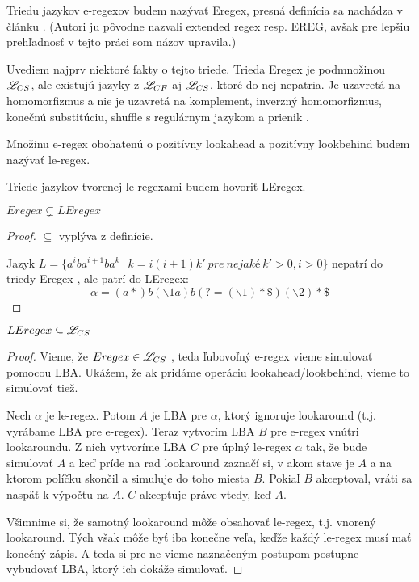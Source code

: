 Triedu jazykov e-regexov budem nazývať Eregex, presná definícia sa nachádza v článku \cite{ExtendedRegexPower}. (Autori ju pôvodne nazvali extended regex resp. EREG, avšak pre lepšiu prehľadnosť v tejto práci som názov upravila.)

Uvediem najprv niektoré fakty o tejto triede.
Trieda Eregex je podmnožinou $\mathscr{L}_{CS}$, ale existujú jazyky z $\mathscr{L}_{CF}$ aj $\mathscr{L}_{CS}$, ktoré do nej nepatria. Je uzavretá na homomorfizmus a nie je uzavretá na komplement, inverzný homomorfizmus, konečnú substitúciu, shuffle s regulárnym jazykom \cite{ExtendedRegexPower} a prienik \cite{ExtendedRegexIntersec}.

\begin{df}
Množinu e-regex obohatenú o pozitívny lookahead a pozitívny lookbehind budem nazývať le-regex.
\end{df}

\begin{df}
Triede jazykov tvorenej le-regexami budem hovoriť LEregex.
\end{df}

\begin{veta}
$ Eregex \subsetneq LEregex $
\end{veta}
\begin{proof}
$ \subseteq $ vyplýva z definície.

Jazyk $L = \lbrace a^iba^{i+1}ba^k ~|~ k=i(i+1)k' ~ pre ~ nejaké ~ k'>0, i>0 \rbrace$ nepatrí do triedy Eregex \cite[Lemma 2]{ExtendedRegexIntersec}, ale patrí do LEregex:
$$ \alpha = (a*)b(\backslash 1a)b(?=(\backslash 1)* \mathdollar )(\backslash 2)* \mathdollar $$
\end{proof}

\begin{veta}
$ LEregex \subseteq \mathscr{L}_{CS} $
\end{veta}
\begin{proof}
Vieme, že $ Eregex \in \mathscr{L}_{CS} $ \cite[Theorem 1]{ExtendedRegexPower}, teda ľubovoľný e-regex vieme simulovať pomocou LBA. Ukážem, že ak pridáme operáciu lookahead/lookbehind, vieme to simulovať tiež.

Nech $\alpha$ je le-regex. Potom $A$ je LBA pre $\alpha$, ktorý ignoruje lookaround (t.j. vyrábame LBA pre e-regex). Teraz vytvorím LBA $B$ pre e-regex vnútri lookaroundu. Z nich vytvoríme LBA $C$ pre úplný le-regex $\alpha$ tak, že bude simulovať $A$ a keď príde na rad lookaround zaznačí si, v akom stave je $A$ a na ktorom políčku skončil a simuluje do toho miesta $B$. Pokiaľ $B$ akceptoval, vráti sa naspäť k výpočtu na $A$. $C$ akceptuje práve vtedy, keď $A$.

Všimnime si, že samotný look\-a\-round môže obsahovať le-regex, t.j. vnorený lookaround. Tých však môže byť iba konečne veľa, keďže každý le-regex musí mať konečný zápis. A teda si pre ne vieme naznačeným postupom postupne vybudovať LBA, ktorý ich dokáže simulovať.
\end{proof}

